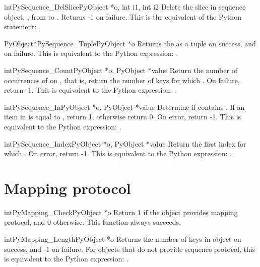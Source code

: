      \begin{cfuncdesc}{int}{PySequence_DelSlice}{PyObject *o, int i1, int i2}
	 Delete the slice in sequence object, , from  to .
	 Returns -1 on failure. This is the equivalent of the Python
	 statement: .
     \end{cfuncdesc}

     \begin{cfuncdesc}{PyObject*}{PySequence_Tuple}{PyObject *o}
	 Returns the  as a tuple on success, and {\NULL} on failure.
	 This is equivalent to the Python expression: .
     \end{cfuncdesc}

     \begin{cfuncdesc}{int}{PySequence_Count}{PyObject *o, PyObject *value}
         Return the number of occurrences of  on , that is,
	 return the number of keys for which .  On
	 failure, return -1.  This is equivalent to the Python
	 expression: .
     \end{cfuncdesc}

     \begin{cfuncdesc}{int}{PySequence_In}{PyObject *o, PyObject *value}
	 Determine if  contains .  If an item in  is equal to
	 , return 1, otherwise return 0.  On error, return -1.  This
	 is equivalent to the Python expression: .
     \end{cfuncdesc}

     \begin{cfuncdesc}{int}{PySequence_Index}{PyObject *o, PyObject *value}
	 Return the first index for which .  On error,
	 return -1.    This is equivalent to the Python
	 expression: .
     \end{cfuncdesc}

\section{Mapping protocol}

     \begin{cfuncdesc}{int}{PyMapping_Check}{PyObject *o}
         Return 1 if the object provides mapping protocol, and 0
	 otherwise.  
	 This function always succeeds.
     \end{cfuncdesc}


     \begin{cfuncdesc}{int}{PyMapping_Length}{PyObject *o}
         Returns the number of keys in object  on success, and -1 on
	 failure.  For objects that do not provide sequence protocol,
	 this is equivalent to the Python expression: .
     \end{cfuncdesc}


